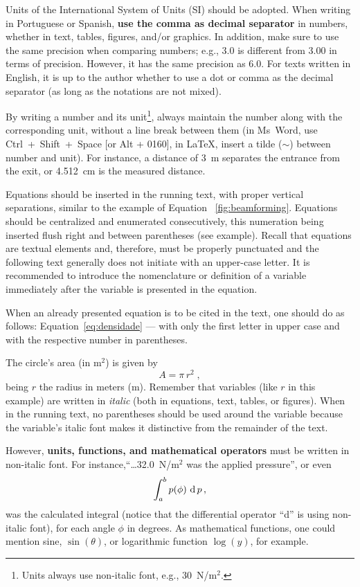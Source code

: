 \documentclass[12pt, a4paper, twoside, twocolumn]{article}
\begin{document}
Units of the International System of Units (SI) should be adopted. When writing in Portuguese or Spanish, \textbf{use the comma as decimal separator} in numbers, whether in text, tables, figures, and/or graphics. In addition, make sure to use the same precision when comparing numbers; e.g., 3.0 is different from 3.00 in terms of precision. However, it has the same precision as 6.0. For texts written in English, it is up to the author whether to use a dot or comma as the decimal separator (as long as the notations are not mixed). 

By writing a number and its unit\footnote{Units always use non-italic font, e.g., 30~N/m$^2$.}, always maintain the number along with the corresponding unit, without a line break between them (in Ms~Word, use Ctrl~+~Shift~+~Space [or Alt + 0160], in \LaTeX, insert a tilde ($\sim$) between number and unit). For instance, a distance of 3~m separates the entrance from the exit, or 4.512~cm is the measured distance.

Equations should be inserted in the running text, with proper vertical separations, similar to the example of Equation ~\eqref{fig:beamforming}. Equations should be centralized and enumerated consecutively, this numeration being inserted flush right and between parentheses (see example). Recall that equations are textual elements and, therefore, must be properly punctuated and the following text generally does not initiate with an upper-case letter. It is recommended to introduce the nomenclature or definition of a variable immediately after the variable is presented in the equation.

When an already presented equation is to be cited in the text, one should do as follows: Equation~\eqref{eq:densidade} --- with only the first letter in upper case and with the respective number in parentheses.

The circle's area (in m$^2$) is given by
\begin{equation}
	A = \pi \, r^2\;,
\label{eq:area-circ}
\end{equation}
being $r$ the radius in meters (m). 
%
Remember that variables (like $r$ in this example) are written in \textit{italic} (both in equations, text, tables, or figures). When in the running text, no parentheses should be used around the variable because the variable's italic font makes it distinctive from the remainder of the text. 

However, \textbf{units, functions, and mathematical operators} must be written in non-italic font. For instance,``\ldots  32.0~N/m$^2$ was the applied pressure'', or even
%
\begin{equation}
	\int_a^b p(\phi)\, \operatorname{d} p\,,
\label{eq:int}
\end{equation}
%
was the calculated integral (notice that the differential operator ``d'' is using non-italic font), for each angle $\phi$ in degrees. As mathematical functions, one could mention sine, $\sin(\theta)$, or logarithmic function $\log(y)$, for example.
\end{document}
